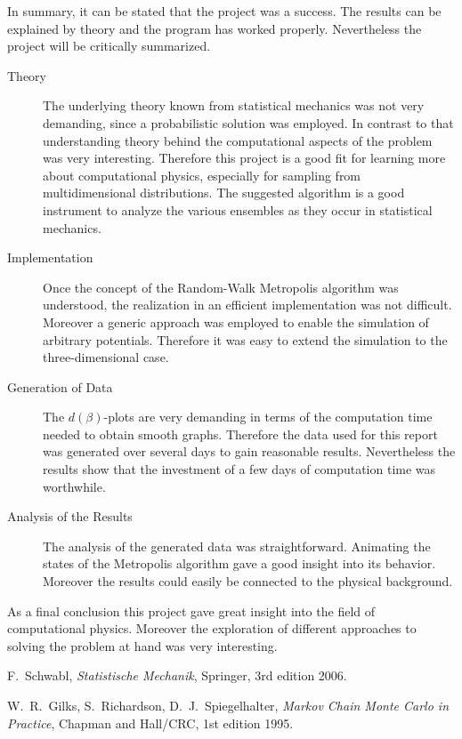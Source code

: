 \documentclass[11pt, a4paper]{article}
\numberwithin{equation}{section}
\begin{document}
In summary, it can be stated that the project was a success.
The results can be explained by theory and the program has worked properly.
Nevertheless the project will be critically summarized.
\begin{description}
\item[Theory]
	The underlying theory known from statistical mechanics was not very demanding, since a probabilistic solution was employed.
	In contrast to that understanding theory behind the computational aspects of the problem was very interesting.
	Therefore this project is a good fit for learning more about computational physics, especially for sampling from multidimensional distributions.
	The suggested algorithm is a good instrument to analyze the various ensembles as they occur in statistical mechanics.

\item[Implementation]
	Once the concept of the Random-Walk Metropolis algorithm was understood, the realization in an efficient implementation was not difficult.
	Moreover a generic approach was employed to enable the simulation of arbitrary potentials.
	Therefore it was easy to extend the simulation to the three-dimensional case.

\item[Generation of Data]
	The $d(\beta)$-plots are very demanding in terms of the computation time needed to obtain smooth graphs.
	Therefore the data used for this report was generated over several days to gain reasonable results.
	Nevertheless the results show that the investment of a few days of computation time was worthwhile.

\item[Analysis of the Results]
	The analysis of the generated data was straightforward.
	Animating the states of the Metropolis algorithm gave a good insight into its behavior.
	Moreover the results could easily be connected to the physical background.
\end{description}
As a final conclusion this project gave great insight into the field of computational physics.
Moreover the exploration of different approaches to solving the problem at hand was very interesting.

\FloatBarrier
\vspace{\fill}
\begin{thebibliography}{9}
	F.\ Schwabl,
	\emph{Statistische Mechanik},
	Springer, 3rd edition 2006.

	W.\ R.\ Gilks, S.\ Richardson, D.\ J.\ Spiegelhalter,
	\emph{Markov Chain Monte Carlo in Practice},
	Chapman and Hall/CRC, 1st edition 1995.
\end{thebibliography}
\end{document}
